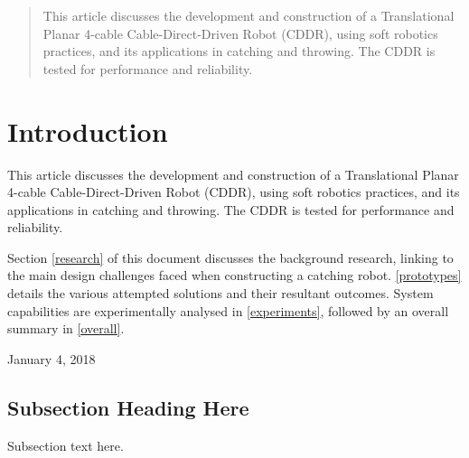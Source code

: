 \documentclass[conference]{IEEEtran}
\begin{document}
	
	
	
	
	
	
	
	\maketitle
	
	\begin{abstract}
This article discusses the development and construction of a Translational Planar 4-cable Cable-Direct-Driven Robot (CDDR), using soft robotics practices, and its applications in catching and throwing. The CDDR is tested for performance and reliability.
	\end{abstract}
	
	
	
	
	
	\IEEEpeerreviewmaketitle
	
	
	
	\section{Introduction}
This article discusses the development and construction of a Translational Planar 4-cable Cable-Direct-Driven Robot (CDDR), using soft robotics practices, and its applications in catching and throwing. The CDDR is tested for performance and reliability.

Section \ref{research} of this document discusses the background research, linking to the main design challenges faced when constructing a catching robot. \ref{prototypes} details the various attempted solutions and their resultant outcomes. System capabilities are experimentally analysed in \ref{experiments}, followed by an overall summary in \ref{overall}.
	

	
	\hfill January 4, 2018
	
	\subsection{Subsection Heading Here}
	Subsection text here.
	
\end{document}
